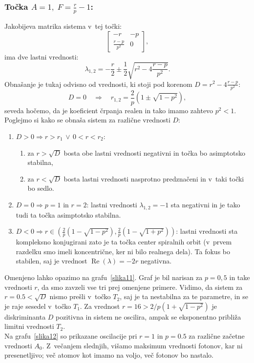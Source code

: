\documentclass[a4paper,pdftex,10pt]{article}
\numberwithin{equation}{section} %
\numberwithin{figure}{section} %
\numberwithin{table}{section} %
\begin{document}
\subsubsection{Točka $A = 1, \; F=\frac{r}{p} - 1$:}
Jakobijeva matrika sistema v~tej točki:
\begin{equation}
    \begin{bmatrix}
	-r & -p \\
	\frac{r-p}{p^2} & 0
    \end{bmatrix},
\end{equation}
ima dve lastni vrednosti:
\begin{equation}
    \lambda_{1,2} = -\frac{r}{2} \pm \frac{1}{2} \sqrt{r^2 - 4\frac{r-p}{p^2}}. 
\end{equation}
Obnašanje je tukaj odvisno od vrednosti, ki stoji pod korenom $D=r^2 - 4\frac{r-p}{p^2}$:
\begin{equation}
    D=0 \quad \Rightarrow \quad r_{1,2} = \frac{2}{p} (1 \pm \sqrt{1-p^2}),
\end{equation}
seveda hočemo, da je koeficient črpanja realen in tako imamo zahtevo $p^2<1$. Poglejmo
si kako se obnaša sistem za različne vrednosti $D$:
\begin{enumerate}
    \item $D>0 \Rightarrow r>r_1 \, \vee \, 0<r<r_2$: 
	\begin{enumerate}
	    \item za $r > \sqrt{D}$ bosta obe lastni vrednosti negativni in točka bo 
		asimptotsko stabilna,
	    \item za $r < \sqrt{D}$ bosta lastni vrednosti nasprotno predznačeni
		in v~taki točki bo sedlo.
	\end{enumerate}
    \item $D=0 \Rightarrow p=1 \text{ in } r=2$: lastni vrednosti $\lambda_{1,2} = -1$
	sta negativni in je tako tudi ta točka asimptotsko stabilna.
    \item $D<0 \Rightarrow r \in (\frac{2}{p} (1-\sqrt{1-p^2}), \frac{2}{p} 
	(1-\sqrt{1+p^2}))$: lastni vrednosti sta kompleksno konjugirani zato je ta točka
	center spiralnih orbit (v~prvem razdelku smo imeli koncentrične, ker ni bilo 
	realnega dela). 
	Ta fokus bo stabilen, saj je vrednost $\operatorname{Re}(\lambda)=-2r$ negativna.
\end{enumerate}
Omenjeno lahko opazimo na grafu~\ref{slika11}. Graf je bil narisan za $p=0,5$ in take
vrednosti $r$, da smo zavzeli vse tri prej omenjene primere. Vidimo, da sistem za 
$r=0.5<\sqrt{D}$ nismo prešli v~točko $T_2$, saj je ta nestabilna za te parametre, in se je
raje sesedel v~točko $T_1$. Za vrednost $r=16>2/p (1+\sqrt{1-p^2})$ je diskriminanta $D$
pozitivna in sistem ne oscilira, ampak se eksponentno približa limitni vrednosti $T_2$.\\
Na grafu~\ref{slika12} so prikazane oscilacije pri $r=1$ in $p=0.5$ za različne začetne
vrednosti $A_0$. Z~večanjem slednjih, višamo maksimum vrednosti fotonov, kar ni 
presenetljivo; več atomov kot imamo na voljo, več fotonov bo nastalo.
\end{document}
